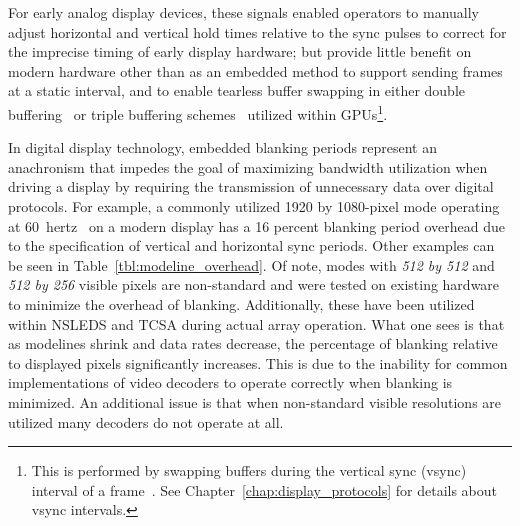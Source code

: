     For early analog display devices, these signals enabled operators to manually adjust horizontal and vertical hold times relative to the sync pulses to correct for the imprecise timing of early display hardware; but provide little benefit on modern hardware other than as an embedded method to support sending frames at a static interval, and to enable tearless buffer swapping in either double buffering~\cite{FriedbergEtAl1990} or triple buffering schemes~\cite{3dfx1997} utilized within GPUs\footnote{This is performed by swapping buffers during the vertical sync (vsync) interval of a frame~\cite{3dfx1999,3dfx1999_2}. See Chapter~\ref{chap:display_protocols} for details about vsync intervals.}.

    In digital display technology, embedded blanking periods represent an anachronism that impedes the goal of maximizing bandwidth utilization when driving a display by requiring the transmission of unnecessary data over digital protocols. For example, a commonly utilized 1920 by 1080-pixel mode operating at \mbox{60 hertz}~\cite{MythTV2015} on a modern display has a 16 percent blanking period overhead due to the specification of vertical and horizontal sync periods. Other examples can be seen in Table~\ref{tbl:modeline_overhead}. Of note, modes with {\it 512 by 512} and {\it 512 by 256} visible pixels are non-standard and were tested on existing hardware to minimize the overhead of blanking. Additionally, these have been utilized within NSLEDS and TCSA during actual array operation. What one sees is that as modelines shrink and data rates decrease, the percentage of blanking relative to displayed pixels significantly increases. This is due to the inability for common implementations of video decoders to operate correctly when blanking is minimized. An additional issue is that when non-standard visible resolutions are utilized many decoders do not operate at all.

